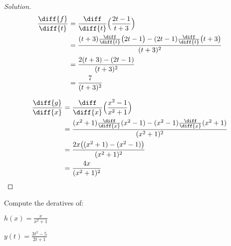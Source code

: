\documentclass[crop=false,class=book,oneside]{standalone}                      %
\begin{document}
            \begin{proof}[Solution]
                \par\hfill\par
                \begin{minipage}[b]{.49\textwidth}
                    \centering
                    \begin{align*}
                        \frac{\diff{f}}{\diff{t}}
                        &=\frac{\diff}{\diff{t}}
                            \Big(\frac{2t-1}{t+3}\Big)\\
                        &=\frac{(t+3)\frac{\diff}{\diff{t}}
                                \big(2t-1\big)-
                                (2t-1)\frac{\diff}{\diff{t}}
                                \big(t+3\big)}
                               {(t+3)^{2}}\\
                        &=\frac{2(t+3)-(2t-1)}{(t+3)^{2}}\\
                        &=\frac{7}{(t+3)^{2}}
                    \end{align*}
                \end{minipage}
                \hfill
                \vline
                \begin{minipage}[b]{.49\textwidth}
                    \centering
                    \begin{align*}
                        \frac{\diff{g}}{\diff{x}}
                        &=\frac{\diff}{\diff{x}}
                            \Big(\frac{x^{2}-1}{x^{2}+1}\Big)\\
                        &=\frac{(x^{2}+1)\frac{\diff}{\diff{x}}
                                (x^{2}-1)-(x^{2}-1)
                                \frac{\diff}{\diff{x}}(x^{2}+1)}
                               {(x^{2}+1)^{2}}\\
                        &=\frac{2x\big((x^{2}+1)-(x^{2}-1)\big)}
                               {(x^{2}+1)^{2}}\\
                        &=\frac{4x}{(x^{2}+1)^{2}}
                    \end{align*}
                \end{minipage}
            \end{proof}
            \begin{problem}
                Compute the deratives of:
                \begin{enumerate}[label=(\alph*)]
                    \begin{multicols}{2}
                        \item $h(x)=\frac{x}{x^{2}+1}$
                        \item $y(t)=\frac{3t^{2}-5}{2t+1}$
                    \end{multicols}
                \end{enumerate}
            \end{problem}
\end{document}
